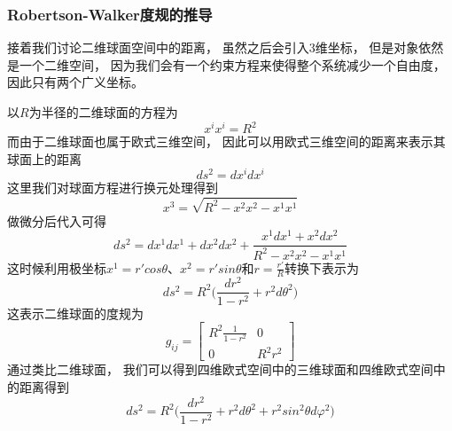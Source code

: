 \documentclass[8pt]{beamer}
\begin{document}
        \begin{frame}[fragile]
            \frametitle{Robertson-Walker度规的推导}
            \begin{multicols}{2}  
                \qquad   
                接着我们讨论二维球面空间中的距离，
                虽然之后会引入3维坐标，
                但是对象依然是一个二维空间，
                因为我们会有一个约束方程来使得整个系统减少一个自由度，
                因此只有两个广义坐标。

                \qquad
                以$R$为半径的二维球面的方程为
                $$x^ix^i=R^2$$
                而由于二维球面也属于欧式三维空间，
                因此可以用欧式三维空间的距离来表示其球面上的距离
                $$ds^2=dx^idx^i$$
                这里我们对球面方程进行换元处理得到
                $$x^3=\sqrt{{R}^2-{x^2}{x^2}-{x^1}{x^1}}$$
                做微分后代入可得
                $$ds^2=dx^1dx^1+dx^2dx^2+\frac{x^1dx^1+x^2dx^2}{{R}^2-{x^2}{x^2}-{x^1}{x^1}}$$
                这时候利用极坐标$x^1=r'cos\theta$、$x^2=r'sin\theta$和$r=\frac{r'}{R}$转换下表示为
                $$ds^2=R^2\biggl(\frac{dr^2}{1-r^2}+r^2d\theta^2\biggr)$$
                这表示二维球面的度规为
                $$g_{ij}=
                \begin{bmatrix}
                    R^2\frac{1}{1-r^2} & 0 \\
                    0                  & R^2r^2 
                \end{bmatrix}
                $$
                通过类比二维球面，
                我们可以得到四维欧式空间中的三维球面和四维欧式空间中的距离得到
                $$ds^2=R^2\biggl(\frac{dr^2}{1-r^2}+r^2d\theta^2+r^2sin^2\theta d\varphi^2\biggr)$$
            \end{multicols}
        \end{frame}
\end{document}

